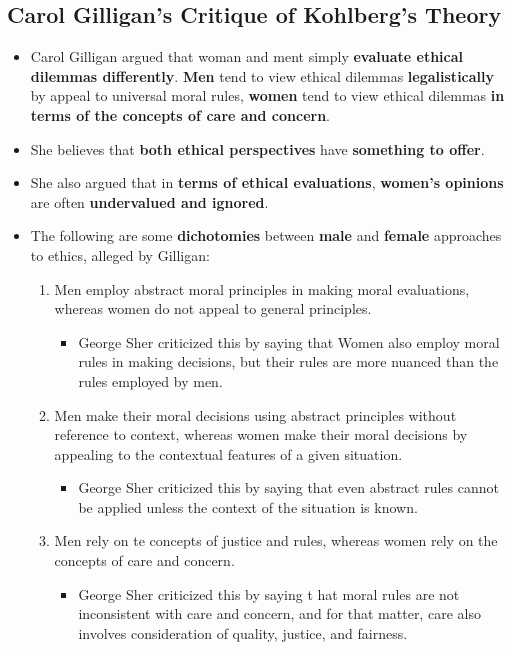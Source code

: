 \documentclass{article}
\begin{document}
    \subsection*{Carol Gilligan's Critique of Kohlberg's Theory}
    \begin{itemize}
        \item Carol Gilligan argued that woman and ment simply \textbf{evaluate ethical dilemmas differently}. \textbf{Men} tend to view ethical dilemmas \textbf{legalistically} by appeal to universal moral rules, \textbf{women} tend to view ethical dilemmas \textbf{in terms of the concepts of care and concern}.
        \item She believes that \textbf{both ethical perspectives} have \textbf{something to offer}.
        \item She also argued that in \textbf{terms of ethical evaluations}, \textbf{women's opinions} are often \textbf{undervalued and ignored}.
        \item The following are some \textbf{dichotomies} between \textbf{male} and \textbf{female} approaches to ethics, alleged by Gilligan:
        \begin{enumerate}
            \item Men employ abstract moral principles in making moral evaluations, whereas women do not appeal to general principles.
            \begin{itemize}
                \item George Sher criticized this by saying that Women also employ moral rules in making decisions, but their rules are more nuanced than the rules employed by men.
            \end{itemize}
            \item Men make their moral decisions using abstract principles without reference to context, whereas women make their moral decisions by appealing to the contextual features of a given situation.
            \begin{itemize}
                \item George Sher criticized this by saying that even abstract rules cannot be applied unless the context of the situation is known.
            \end{itemize}
            \item Men rely on te concepts of justice and rules, whereas women rely on the concepts of care and concern.
            \begin{itemize}
                \item George Sher criticized this by saying t hat moral rules are not inconsistent with care and concern, and for that matter, care also involves consideration of quality, justice, and fairness.
            \end{itemize} 
        \end{enumerate}
    \end{itemize}
\end{document}
